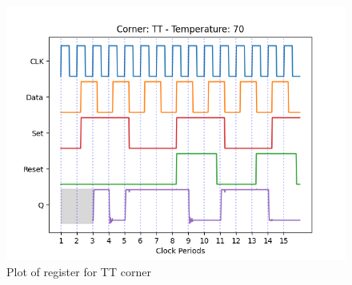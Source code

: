 \begin{figure}[H]
    \centering
    \begin{minipage}{0.5\textwidth}
        \centering
        \includegraphics[width=\textwidth]{Figures/Aimspice_Plots/TT_70.png}
        \caption{Plot of register for TT corner}
        \label{fig:TT70}
    \end{minipage}%
\end{figure}

